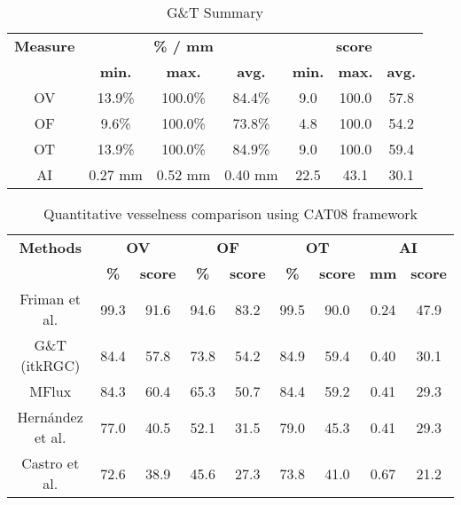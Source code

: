 \begin{table*}
\scriptsize
\caption{G\&T Summary}
\centering
\begin{tabular}{|c|ccc|ccc|}
\hline
\multicolumn{1}{|c|}{\textbf{Measure}} &\multicolumn{3}{c|}{\textbf{\% / mm}} &\multicolumn{3}{c|}{\textbf{score}}  \\
\multicolumn{1}{|c|}{\textbf{}} &\multicolumn{1}{c|}{\textbf{min.}} &\multicolumn{1}{c|}{\textbf{max.}} &\multicolumn{1}{c|}{\textbf{avg.}} &\multicolumn{1}{c|}{\textbf{min.}} &\multicolumn{1}{c|}{\textbf{max.}} &\multicolumn{1}{c|}{\textbf{avg.}}\\
\hline
OV&13.9\%&100.0\%&84.4\%& 9.0&100.0&57.8\\
OF& 9.6\%&100.0\%&73.8\%& 4.8&100.0&54.2\\
OT&13.9\%&100.0\%&84.9\%& 9.0&100.0&59.4\\
AI&0.27 mm&0.52 mm&0.40 mm&22.5&43.1&30.1\\
\hline
\end{tabular}
\vspace{-0.3cm}
\label{tb:tb_4_6}
\normalsize
\end{table*}

\begin{table*}
\scriptsize
\caption{Quantitative vesselness comparison using CAT08 framework}
\centering
\begin{tabular}{|c|cc|cc|cc|cc|}
\hline
\multicolumn{1}{|c|}{\textbf{Methods}} &\multicolumn{2}{c|}{\textbf{OV}} &\multicolumn{2}{c|}{\textbf{OF}} &\multicolumn{2}{c|}{\textbf{OT}}&\multicolumn{2}{c|}{\textbf{AI}}\\
\multicolumn{1}{|c|}{\textbf{}} &\multicolumn{1}{c|}{\textbf{\%}} &\multicolumn{1}{c|}{\textbf{score}} &\multicolumn{1}{c|}{\textbf{\%}} &\multicolumn{1}{c|}{\textbf{score}} &\multicolumn{1}{c|}{\textbf{\%}} &\multicolumn{1}{c|}{\textbf{score}}&\multicolumn{1}{c|}{\textbf{mm}} &\multicolumn{1}{c|}{\textbf{score}}\\
\hline
Friman et al.&99.3 &91.6& 94.6 &83.2 &99.5 & 90.0 &0.24 &47.9\\
G\&T (itkRGC)&84.4&57.8&73.8&54.2&84.9&59.4&0.40&30.1\\
MFlux&84.3&60.4&65.3&50.7&84.4&59.2&0.41&29.3\\
Hern\'andez et al. &77.0& 40.5 &52.1 &31.5 & 79.0 &45.3 &0.41 &29.3 \\
Castro et al.&72.6 &38.9 &45.6 &27.3 &73.8 & 41.0 &0.67 &21.2\\
\hline
\end{tabular}
\vspace{-0.3cm}
\label{tb:tb_4_7}
\normalsize
\end{table*}

